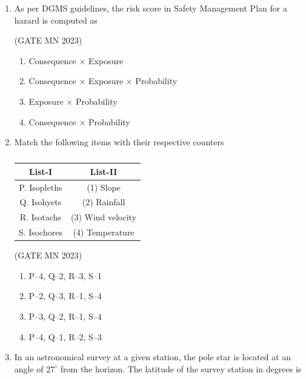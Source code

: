 \documentclass[journal]{IEEEtran}
\begin{document}
\begin{enumerate}
\item As per DGMS guidelines, the risk score in Safety Management Plan for a hazard is computed as  


	\hfill(GATE MN 2023)
\begin{multicols}{2}
\begin{enumerate}
    \item Consequence × Exposure  
    \item Consequence × Exposure × Probability  
    \item Exposure × Probability  
    \item Consequence × Probability  
\end{enumerate}
\end{multicols}

\item Match the following items with their respective counters
\begin{table}[H]
    \centering\normalsize

\begin{tabular}{cc}

List-I & List-II \\
\hline
P. Isopleths & (1) Slope \\
Q. Isohyets  & (2) Rainfall \\
R. Isotachs  & (3) Wind velocity \\
S. Isochores & (4) Temperature \\

\end{tabular}
\caption{}                                          
\label{tab:Q24}                               
\end{table}


\hfill(GATE MN 2023)

\begin{multicols}{2}
\begin{enumerate}
    \item P--4, Q--2, R--3, S--1
    \item P--2, Q--3, R--1, S--4
    \item P--3, Q--2, R--1, S--4
    \item P--4, Q--1, R--2, S--3
\end{enumerate}
\end{multicols}


\item In an astronomical survey at a given station, the pole star is located at an angle of \(27^\circ\) from the horizon. The latitude of the survey station in degrees is  



\end{enumerate}
\end{document}
